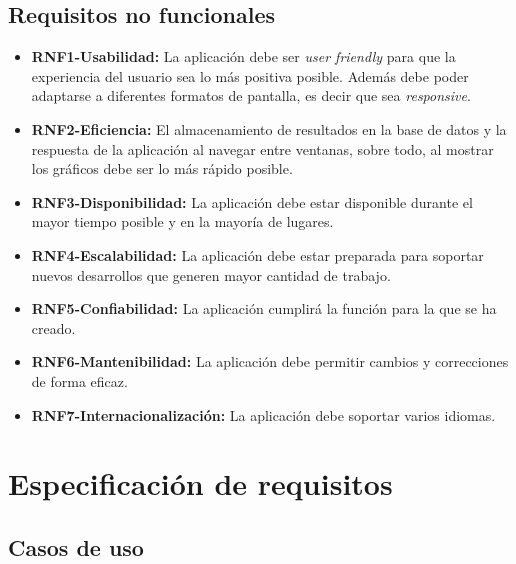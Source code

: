 \newpage
\subsection{Requisitos no funcionales}
\begin{itemize}
\tightlist
    \item \textbf{RNF1-Usabilidad:} La aplicación debe ser \textit{user friendly} para que la experiencia del usuario sea lo más positiva posible. Además debe poder adaptarse a diferentes formatos de pantalla, es decir que sea \textit{responsive}.
    \item \textbf{RNF2-Eficiencia:} El almacenamiento de resultados en la base de datos y la respuesta de la aplicación al navegar entre ventanas, sobre todo, al mostrar los gráficos debe ser lo más rápido posible.
    \item \textbf{RNF3-Disponibilidad:} La aplicación debe estar disponible durante el mayor tiempo posible y en la mayoría de lugares.
    \item \textbf{RNF4-Escalabilidad:} La aplicación debe estar preparada para soportar nuevos desarrollos que generen mayor cantidad de trabajo.
    \item \textbf{RNF5-Confiabilidad:} La aplicación cumplirá la función para la que se ha creado.
    \item \textbf{RNF6-Mantenibilidad:} La aplicación debe permitir cambios y correcciones de forma eficaz. 
    \item \textbf{RNF7-Internacionalización:} La aplicación debe soportar varios idiomas.
    
\end{itemize}
\clearpage

\section{Especificación de requisitos}

\subsection{Casos de uso}

